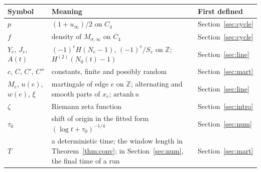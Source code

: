 \documentclass[11pt]{amsart}
\theoremstyle{remark}\newtheorem{remark}[theorem]{Remark}
\begin{document}
\begin{center}
\begin{tabular}{l p{5.6cm} p{2.5cm}}
\toprule
Symbol & Meaning & First defined\\
\midrule
$p$ & $(1+u_\infty)/2$ on $C_4$ & Section~\ref{sec:cycle}\\
$f$ & density of $M_{\sigma,\infty}$ on $C_4$ & Section~\ref{sec:cycle}\\
$Y_e$, $J_v$, $A(t)$ & $(-1)^eH(N_e-1)$, $(-1)^v/S_v$ on $\mathbb{Z}$; $H^{(2)}(N_0(t)-1)$ & Section~\ref{sec:line}\\
$c$, $C$, $C'$, $C''$ & constants, finite and possibly random & Section~\ref{sec:mart}\\
$M_e$, $u(e)$, $w(e)$, $\xi$ & martingale of edge $e$ on $\mathbb{Z}$; alternating and smooth parts of $x_e$; $\mathrm{artanh}\,u$ & Section~\ref{sec:line}\\
$\zeta$ & Riemann zeta function & Section~\ref{sec:intro}\\
$\tau_0$ & shift of origin in the fitted form $(\log t+\tau_0)^{-1/4}$ & Section~\ref{sec:num}\\
$T$ & a deterministic time; the window length in Theorem~\ref{thm:conv}; in Section~\ref{sec:num}, the final time of a run & Section~\ref{sec:mart}\\
\bottomrule
\end{tabular}
\end{center}
\end{document}
